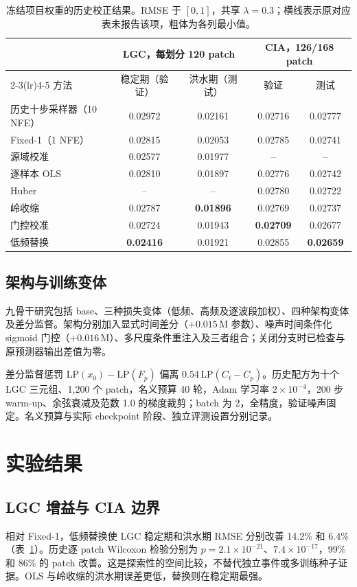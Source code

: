 \documentclass{article}
\begin{document}
\begin{table}[t]
\centering
\caption{冻结项目权重的历史校正结果。RMSE 于 $[0,1]$，共享 $\lambda=0.3$；横线表示原对应表未报告该项，粗体为各列最小值。}
\label{tab:operators}
\begin{tabular}{lcccc}
\toprule
 & \multicolumn{2}{c}{LGC，每划分 120 patch} & \multicolumn{2}{c}{CIA，126/168 patch}\\
\cmidrule(lr){2-3}\cmidrule(lr){4-5}
方法 & 稳定期（验证） & 洪水期（测试） & 验证 & 测试\\
\midrule
历史十步采样器（10 NFE） & 0.02972 & 0.02161 & 0.02716 & 0.02777\\
Fixed-1（1 NFE） & 0.02815 & 0.02053 & 0.02785 & 0.02741\\
源域校准 & 0.02577 & 0.01977 & -- & --\\
逐样本 OLS & 0.02810 & 0.01897 & 0.02776 & 0.02742\\
Huber & -- & -- & 0.02780 & 0.02722\\
岭收缩 & 0.02787 & \textbf{0.01896} & 0.02769 & 0.02737\\
门控校准 & 0.02724 & 0.01943 & \textbf{0.02709} & 0.02677\\
低频替换 & \textbf{0.02416} & 0.01921 & 0.02855 & \textbf{0.02659}\\
\bottomrule
\end{tabular}
\end{table}

\subsection{架构与训练变体}
\label{sec:arch}
九骨干研究包括 base、三种损失变体（低频、高频及逐波段加权）、四种架构变体及差分监督。架构分别加入显式时间差分（$+0.015$\,M 参数）、噪声时间条件化 sigmoid 门控（$+0.016$\,M）、多尺度条件重注入及三者组合；关闭分支时已检查与原预测器输出差值为零。

差分监督惩罚 $\mathrm{LP}(x_0)-\mathrm{LP}(F_p)$ 偏离 $0.54\,\mathrm{LP}(C_t-C_p)$。历史配方为十个 LGC 三元组、1,200 个 patch，名义预算 40 轮，Adam 学习率 $2\times10^{-4}$，200 步 warm-up、余弦衰减及范数 1.0 的梯度裁剪；batch 为 2，全精度，验证噪声固定。名义预算与实际 checkpoint 阶段、独立评测设置分别记录。

\section{实验结果}
\label{sec:exp}
\subsection{LGC 增益与 CIA 边界}
相对 Fixed-1，低频替换使 LGC 稳定期和洪水期 RMSE 分别改善 14.2\% 和 6.4\%（表~\ref{tab:operators}）。历史逐 patch Wilcoxon 检验分别为 $p=2.1\times10^{-21}$、$7.4\times10^{-17}$，99\% 和 86\% 的 patch 改善。这是探索性的空间比较，不替代独立事件或多训练种子证据。OLS 与岭收缩的洪水期误差更低，替换则在稳定期最强。
\end{document}
